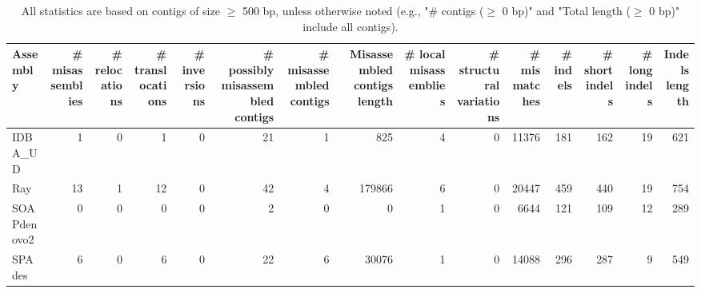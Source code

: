 \documentclass[12pt,a4paper]{article}
\begin{document}
\begin{table}[ht]
\begin{center}
\caption{All statistics are based on contigs of size $\geq$ 500 bp, unless otherwise noted (e.g., "\# contigs ($\geq$ 0 bp)" and "Total length ($\geq$ 0 bp)" include all contigs).}
\begin{tabular}{|l*{14}{|r}|}
\hline
Assembly & \# misassemblies &     \# relocations &     \# translocations &     \# inversions & \# possibly misassembled contigs & \# misassembled contigs & Misassembled contigs length & \# local misassemblies & \# structural variations & \# mismatches & \# indels &     \# short indels &     \# long indels & Indels length \\ \hline
IDBA\_UD & 1 & 0 & 1 & 0 & 21 & 1 & 825 & 4 & 0 & 11376 & 181 & 162 & 19 & 621 \\ \hline
Ray & 13 & 1 & 12 & 0 & 42 & 4 & 179866 & 6 & 0 & 20447 & 459 & 440 & 19 & 754 \\ \hline
SOAPdenovo2 & 0 & 0 & 0 & 0 & 2 & 0 & 0 & 1 & 0 & 6644 & 121 & 109 & 12 & 289 \\ \hline
SPAdes & 6 & 0 & 6 & 0 & 22 & 6 & 30076 & 1 & 0 & 14088 & 296 & 287 & 9 & 549 \\ \hline
\end{tabular}
\end{center}
\end{table}
\end{document}
